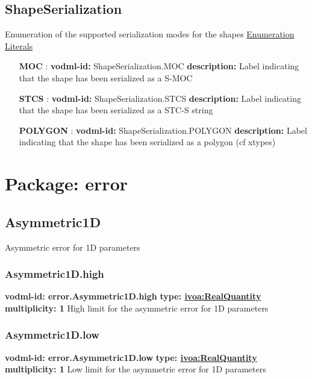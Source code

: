   \subsection{ShapeSerialization}
    \label{sect:ShapeSerialization}
    Enumeration of the supported serialization modes for the shapes
    \noindent \underline{Enumeration Literals}
    \vspace{-\parsep}
    \small
    \begin{itemize}
    \item[\textbf{MOC}]: \textbf{vodml-id:} ShapeSerialization.MOC \newline
    \textbf{description:} Label indicating that the shape has been serialized as a S-MOC
    \item[\textbf{STCS}]: \textbf{vodml-id:} ShapeSerialization.STCS \newline
    \textbf{description:} Label indicating that the shape has been serialized as a STC-S \citep{2007ivoa.spec.1030R} string
    \item[\textbf{POLYGON}]: \textbf{vodml-id:} ShapeSerialization.POLYGON \newline
    \textbf{description:} Label indicating that the shape has been serialized as a polygon (cf xtypes)
    \end{itemize}
    \normalsize

\section{Package: error}

  \subsection{Asymmetric1D}
    \label{sect:error.Asymmetric1D}
    Asymmetric error for 1D parameters

    \subsubsection{Asymmetric1D.high}
    \textbf{vodml-id: error.Asymmetric1D.high} \newline
    \textbf{type: \hyperref[sect:ivoa]{ivoa:RealQuantity}} \newline
    \textbf{multiplicity: 1} \newline
    High limit for the asymmetric error for 1D parameters

    \subsubsection{Asymmetric1D.low}
    \textbf{vodml-id: error.Asymmetric1D.low} \newline
    \textbf{type: \hyperref[sect:ivoa]{ivoa:RealQuantity}} \newline
    \textbf{multiplicity: 1} \newline
    Low limit for the asymmetric error for 1D parameters

